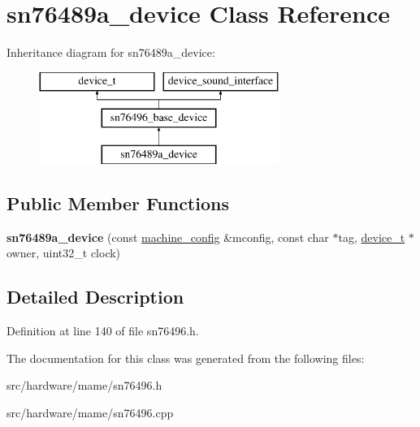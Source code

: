 \hypertarget{classsn76489a__device}{\section{sn76489a\-\_\-device Class Reference}
\label{classsn76489a__device}
}
Inheritance diagram for sn76489a\-\_\-device\-:\begin{figure}[H]
\begin{center}
\leavevmode
\includegraphics[height=3.000000cm]{classsn76489a__device}
\end{center}
\end{figure}
\subsection*{Public Member Functions}
\begin{DoxyCompactItemize}
\item 
\hypertarget{classsn76489a__device_a5a8ba5c28290d010c6e12fc04727103d}{{\bfseries sn76489a\-\_\-device} (const \hyperlink{structmachine__config}{machine\-\_\-config} \&mconfig, const char $\ast$tag, \hyperlink{classdevice__t}{device\-\_\-t} $\ast$owner, uint32\-\_\-t clock)}\label{classsn76489a__device_a5a8ba5c28290d010c6e12fc04727103d}

\end{DoxyCompactItemize}


\subsection{Detailed Description}


Definition at line 140 of file sn76496.\-h.



The documentation for this class was generated from the following files\-:\begin{DoxyCompactItemize}
\item 
src/hardware/mame/sn76496.\-h\item 
src/hardware/mame/sn76496.\-cpp\end{DoxyCompactItemize}
